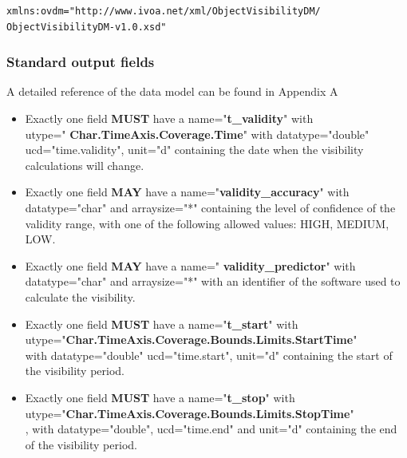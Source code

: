 \documentclass[11pt,a4paper]{ivoa}
\begin{document}
\begin{lstlisting}[language=XML]
xmlns:ovdm="http://www.ivoa.net/xml/ObjectVisibilityDM/
ObjectVisibilityDM-v1.0.xsd"
\end{lstlisting}

\subsubsection{Standard output fields}
A detailed reference of the data model can be found in Appendix A

\begin{itemize}
\item Exactly one field \textbf{MUST} have a name="\textbf{t\_validity}"
with\\ utype=" \textbf{Char.TimeAxis.Coverage.Time}" with
datatype="double" ucd="time.validity", unit="d" containing the date when
the visibility calculations will change.
\end{itemize}


\begin{itemize}
\item Exactly one field \textbf{MAY} have a name="\textbf{validity\_accuracy}" 
with datatype="char" and arraysize="*" containing the level of
confidence of the validity range, with one of the following allowed
values: HIGH, MEDIUM, LOW.
\end{itemize}


\begin{itemize}
\item Exactly one field \textbf{MAY} have a name="\textbf{
validity\_predictor}" with datatype="char" and arraysize="*" with an
identifier of the software used to calculate the visibility.
\end{itemize}


\begin{itemize}
\item Exactly one field \textbf{MUST} have a name="\textbf{t\_start}" with\\
utype="\textbf{Char.TimeAxis.Coverage.Bounds.Limits.StartTime}"\\ with
datatype="double" ucd="time.start", unit="d" containing the start of the
visibility period.
\end{itemize}


\begin{itemize}
\item Exactly one field \textbf{MUST} have a name="\textbf{t\_stop}" with\\
utype="\textbf{Char.TimeAxis.Coverage.Bounds.Limits.StopTime}"\\, with
datatype="double", ucd="time.end" and unit="d" containing the end of the
visibility period.
\end{itemize}
\end{document}
